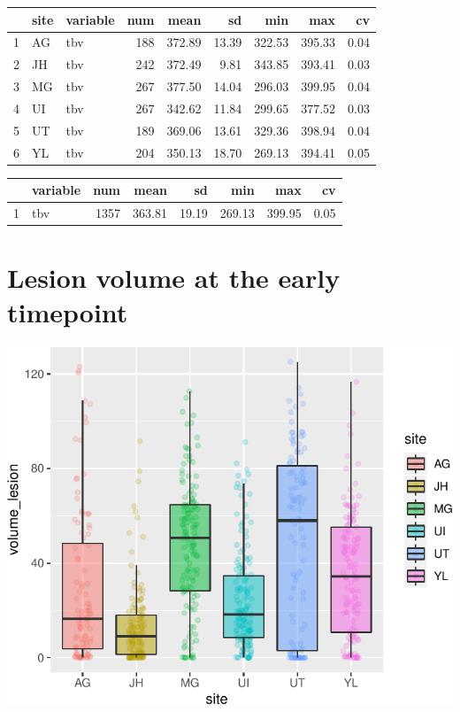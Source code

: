 \documentclass[
]{article}
\begin{document}
\begin{table}[ht]
\centering
\begin{tabular}{rllrrrrrr}
  \hline
 & site & variable & num & mean & sd & min & max & cv \\ 
  \hline
1 & AG & tbv & 188 & 372.89 & 13.39 & 322.53 & 395.33 & 0.04 \\ 
  2 & JH & tbv & 242 & 372.49 & 9.81 & 343.85 & 393.41 & 0.03 \\ 
  3 & MG & tbv & 267 & 377.50 & 14.04 & 296.03 & 399.95 & 0.04 \\ 
  4 & UI & tbv & 267 & 342.62 & 11.84 & 299.65 & 377.52 & 0.03 \\ 
  5 & UT & tbv & 189 & 369.06 & 13.61 & 329.36 & 398.94 & 0.04 \\ 
  6 & YL & tbv & 204 & 350.13 & 18.70 & 269.13 & 394.41 & 0.05 \\ 
   \hline
\end{tabular}
\end{table}
\begin{table}[ht]
\centering
\begin{tabular}{rlrrrrrr}
  \hline
 & variable & num & mean & sd & min & max & cv \\ 
  \hline
1 & tbv & 1357 & 363.81 & 19.19 & 269.13 & 399.95 & 0.05 \\ 
   \hline
\end{tabular}
\end{table}

\hypertarget{lesion-volume-at-the-early-timepoint}{%
\section{Lesion volume at the early
timepoint}\label{lesion-volume-at-the-early-timepoint}}

\begin{center}\includegraphics{paper_files/figure-latex/plot_lesion_early-1} \end{center}
\end{document}
